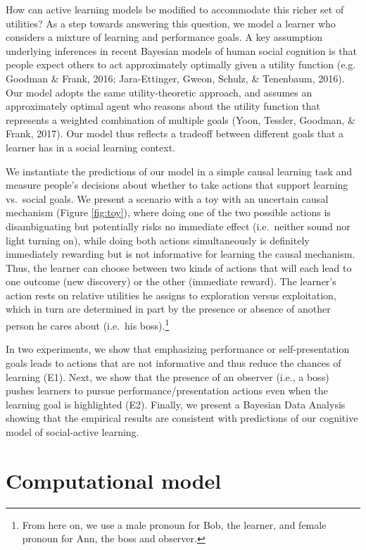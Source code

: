 \documentclass[10pt, letterpaper]{article}
\begin{document}
How can active learning models be modified to accommodate this richer
set of utilities? As a step towards answering this question, we model a
learner who considers a mixture of learning and performance goals. A key
assumption underlying inferences in recent Bayesian models of human
social cognition is that people expect others to act approximately
optimally given a utility function (e.g. Goodman \& Frank, 2016;
Jara-Ettinger, Gweon, Schulz, \& Tenenbaum, 2016). Our model adopts the
same utility-theoretic approach, and assumes an approximately optimal
agent who reasons about the utility function that represents a weighted
combination of multiple goals (Yoon, Tessler, Goodman, \& Frank, 2017).
Our model thus reflects a tradeoff between different goals that a
learner has in a social learning context.

We instantiate the predictions of our model in a simple causal learning
task and measure people's decisions about whether to take actions that
support learning vs.~social goals. We present a scenario with a toy with
an uncertain causal mechanism (Figure \ref{fig:toy}), where doing one of
the two possible actions is disambiguating but potentially risks no
immediate effect (i.e.~neither sound nor light turning on), while doing
both actions simultaneously is definitely immediately rewarding but is
not informative for learning the causal mechanism. Thus, the learner can
choose between two kinds of actions that will each lead to one outcome
(new discovery) or the other (immediate reward). The learner's action
rests on relative utilities he assigns to exploration versus
exploitation, which in turn are determined in part by the presence or
absence of another person he cares about (i.e.~his
boss).\footnote{From here on, we use a male pronoun for Bob, the learner, and female pronoun for Ann, the boss and observer.}

In two experiments, we show that emphasizing performance or
self-presentation goals leads to actions that are not informative and
thus reduce the chances of learning (E1). Next, we show that the
presence of an observer (i.e., a boss) pushes learners to pursue
performance/presentation actions even when the learning goal is
highlighted (E2). Finally, we present a Bayesian Data Analysis showing
that the empirical results are consistent with predictions of our
cognitive model of social-active learning.

\section{Computational model}\label{computational-model}
\end{document}
